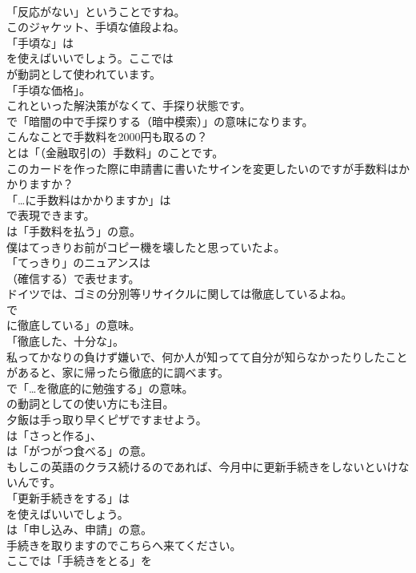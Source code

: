 \documentclass[8pt]{extreport}
\begin{document}
\begin{CJK}{UTF8}{min}
\\	「反応がない」ということですね。	
\\	このジャケット、手頃な値段よね。 
\\	「手頃な」は
\\	を使えばいいでしょう。ここでは
\\	が動詞として使われています。
\\	「手頃な価格」。	
\\	これといった解決策がなくて、手探り状態です。 
\\	で「暗闇の中で手探りする（暗中模索）」の意味になります。	
\\	こんなことで手数料を2000円も取るの？ 
\\	とは「（金融取引の）手数料」のことです。	
\\	このカードを作った際に申請書に書いたサインを変更したいのですが手数料はかかりますか？ 
\\	「…に手数料はかかりますか」は 
\\	で表現できます。
\\	は「手数料を払う」の意。	
\\	僕はてっきりお前がコピー機を壊したと思っていたよ。 
\\	「てっきり」のニュアンスは
\\	（確信する）で表せます。	
\\	ドイツでは、ゴミの分別等リサイクルに関しては徹底しているよね。 
\\	で
\\	に徹底している」の意味。
\\	「徹底した、十分な」。	
\\	私ってかなりの負けず嫌いで、何か人が知ってて自分が知らなかったりしたことがあると、家に帰ったら徹底的に調べます。 
\\	で「…を徹底的に勉強する」の意味。
\\	の動詞としての使い方にも注目。	
\\	夕飯は手っ取り早くピザですませよう。 
\\	は「さっと作る」、
\\	は「がつがつ食べる」の意。	
\\	もしこの英語のクラス続けるのであれば、今月中に更新手続きをしないといけないんです。 
\\	「更新手続きをする」は
\\	を使えばいいでしょう。
\\	は「申し込み、申請」の意。	
\\	手続きを取りますのでこちらへ来てください。 
\\	ここでは「手続きをとる」を

\end{CJK}
\end{document}

